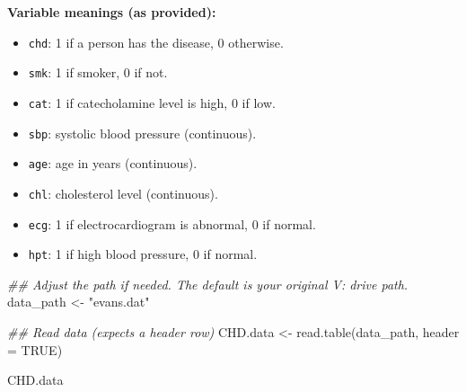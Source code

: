 \documentclass[
  letterpaper,
]{scrbook}
\newenvironment{Shaded}{\begin{snugshade}}{\end{snugshade}}
\newcommand{\AttributeTok}[1]{\textcolor[rgb]{0.40,0.45,0.13}{#1}}
\newcommand{\ConstantTok}[1]{\textcolor[rgb]{0.56,0.35,0.01}{#1}}
\newcommand{\DocumentationTok}[1]{\textcolor[rgb]{0.37,0.37,0.37}{\textit{#1}}}
\newcommand{\FunctionTok}[1]{\textcolor[rgb]{0.28,0.35,0.67}{#1}}
\newcommand{\NormalTok}[1]{\textcolor[rgb]{0.00,0.23,0.31}{#1}}
\newcommand{\OtherTok}[1]{\textcolor[rgb]{0.00,0.23,0.31}{#1}}
\newcommand{\StringTok}[1]{\textcolor[rgb]{0.13,0.47,0.30}{#1}}
\providecommand{\tightlist}{%
  \setlength{\itemsep}{0pt}\setlength{\parskip}{0pt}}\usepackage{longtable,booktabs,array}
\begin{document}
\textbf{Variable meanings (as provided):}

\begin{itemize}
\tightlist
\item
  \texttt{chd}: 1 if a person has the disease, 0 otherwise.
\item
  \texttt{smk}: 1 if smoker, 0 if not.
\item
  \texttt{cat}: 1 if catecholamine level is high, 0 if low.
\item
  \texttt{sbp}: systolic blood pressure (continuous).
\item
  \texttt{age}: age in years (continuous).
\item
  \texttt{chl}: cholesterol level (continuous).
\item
  \texttt{ecg}: 1 if electrocardiogram is abnormal, 0 if normal.
\item
  \texttt{hpt}: 1 if high blood pressure, 0 if normal.
\end{itemize}

\begin{Shaded}
\begin{Highlighting}[]
\DocumentationTok{\#\# Adjust the path if needed. The default is your original V: drive path.}
\NormalTok{data\_path }\OtherTok{\textless{}{-}} \StringTok{"evans.dat"}

\DocumentationTok{\#\# Read data (expects a header row)}
\NormalTok{CHD.data }\OtherTok{\textless{}{-}} \FunctionTok{read.table}\NormalTok{(data\_path, }\AttributeTok{header =} \ConstantTok{TRUE}\NormalTok{)}

\NormalTok{CHD.data}
\end{Highlighting}
\end{Shaded}
\end{document}
